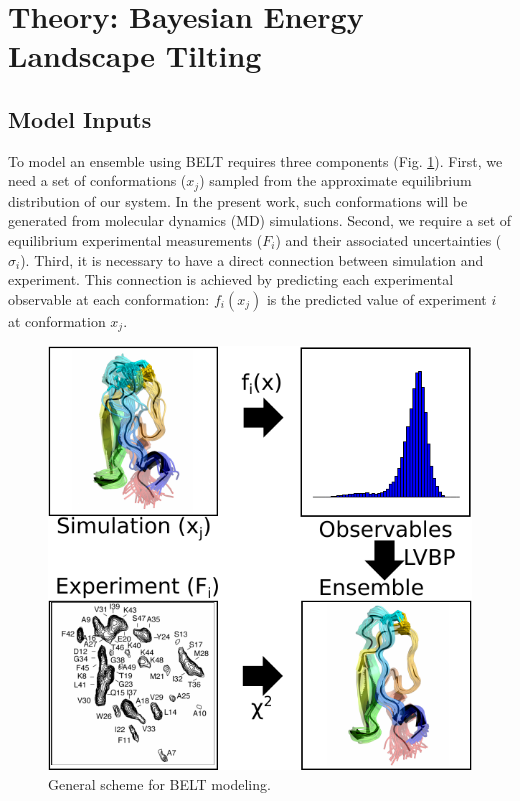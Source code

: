 \documentclass[journal=jacsat,manuscript=article]{achemso}
\begin{document}
\section{Theory: Bayesian Energy Landscape Tilting}

\subsection{Model Inputs}

To model an ensemble using BELT requires three components (Fig. \ref{figure:BELT}).  First, we need a set of conformations ($x_j$) sampled from the approximate equilibrium distribution of our system.  In the present work, such conformations will be generated from molecular dynamics (MD) simulations.  Second, we require a set of equilibrium experimental measurements ($F_i$) and their associated uncertainties ($\sigma_i$).  Third, it is necessary to have a direct connection between simulation and experiment.  This connection is achieved by predicting each experimental observable at each conformation: $f_i(x_j)$ is the predicted value of experiment $i$ at conformation $x_j$.  

\begin{figure}

\includegraphics[width=18.0cm]{figures/info_graphic/info_graphic.pdf}

\caption{
General scheme for BELT modeling.
}
\label{figure:BELT}
\end{figure}
\end{document}
